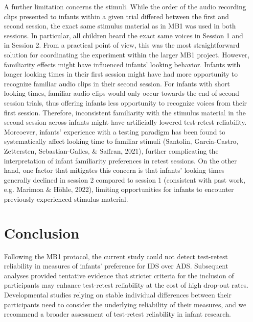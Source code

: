 \documentclass[
  english,
  man,floatsintext]{apa6}
\begin{document}
A further limitation concerns the stimuli. While the order of the audio recording clips presented to infants within a given trial differed between the first and second session, the exact same stimulus material as in MB1 was used in both sessions.
In particular, all children heard the exact same voices in Session 1 and in Session 2.
From a practical point of view, this was the most straightforward solution for coordinating the experiment within the larger MB1 project.
However, familiarity effects might have influenced infants' looking behavior.
Infants with longer looking times in their first session might have had more opportunity to recognize familiar audio clips in their second session.
For infants with short looking times, familiar audio clips would only occur towards the end of second-session trials, thus offering infants less opportunity to recognize voices from their first session.
Therefore, inconsistent familiarity with the stimulus material in the second session across infants might have artificially lowered test-retest reliability.
Moreoever, infants' experience with a testing paradigm has been found to systematically affect looking time to familiar stimuli (Santolin, Garcia-Castro, Zettersten, Sebastian-Galles, \& Saffran, 2021), further complicating the interpretation of infant familiarity preferences in retest sessions.
On the other hand, one factor that mitigates this concern is that infants' looking times generally declined in session 2 compared to session 1 (consistent with past work, e.g. Marimon \& Höhle, 2022), limiting opportunities for infants to encounter previously experienced stimulus material.

\hypertarget{conclusion}{%
\section{Conclusion}\label{conclusion}}

Following the MB1 protocol, the current study could not detect test-retest reliability in measures of infants' preference for IDS over ADS.
Subsequent analyses provided tentative evidence that stricter criteria for the inclusion of participants may enhance test-retest reliability at the cost of high drop-out rates.
Developmental studies relying on stable individual differences between their participants need to consider the underlying reliability of their measures, and we recommend a broader assessment of test-retest reliability in infant research.

\newpage
\end{document}
